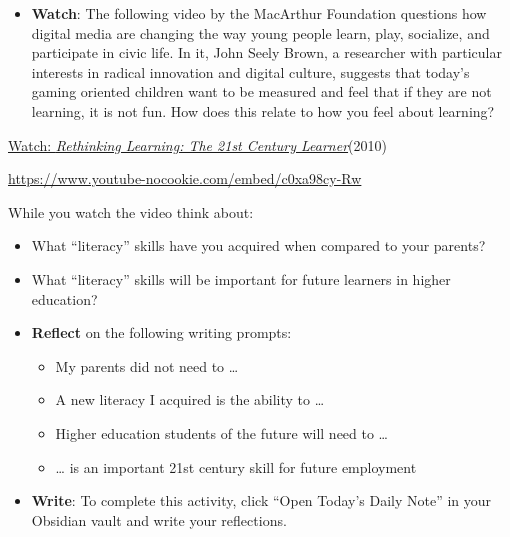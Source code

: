 \documentclass[
  letterpaper,
  DIV=11,
  numbers=noendperiod]{scrreprt}
\providecommand{\tightlist}{%
  \setlength{\itemsep}{0pt}\setlength{\parskip}{0pt}}\usepackage{longtable,booktabs,array}
\begin{document}
\begin{tcolorbox}[enhanced jigsaw, toprule=.15mm, colback=white, colframe=quarto-callout-note-color-frame, bottomtitle=1mm, leftrule=.75mm, coltitle=black, titlerule=0mm, rightrule=.15mm, colbacktitle=quarto-callout-note-color!10!white, left=2mm, title={Learning Activity}, opacitybacktitle=0.6, opacityback=0, breakable, toptitle=1mm, arc=.35mm, bottomrule=.15mm]

\begin{itemize}
\tightlist
\item
  \textbf{Watch}: The following video by the MacArthur Foundation
  questions how digital media are changing the way young people learn,
  play, socialize, and participate in civic life. In it, John Seely
  Brown, a researcher with particular interests in radical innovation
  and digital culture, suggests that today's gaming oriented children
  want to be measured and feel that if they are not learning, it is not
  fun. How does this relate to how you feel about learning?
\end{itemize}

\href{https://www.youtube.com/watch?v=c0xa98cy-Rw}{Watch:
\emph{Rethinking Learning: The 21st Century Learner}}(2010)

\url{https://www.youtube-nocookie.com/embed/c0xa98cy-Rw}

While you watch the video think about:

\begin{itemize}
\item
  What ``literacy'' skills have you acquired when compared to your
  parents?
\item
  What ``literacy'' skills will be important for future learners in
  higher education?
\item
  \textbf{Reflect} on the following writing prompts:

  \begin{itemize}
  \tightlist
  \item
    My parents did not need to \ldots{}
  \item
    A new literacy I acquired is the ability to \ldots{}
  \item
    Higher education students of the future will need to \ldots{}
  \item
    \ldots{} is an important 21st century skill for future employment
  \end{itemize}
\item
  \textbf{Write}: To complete this activity, click ``Open Today's Daily
  Note'' in your Obsidian vault and write your reflections.
\end{itemize}


\end{tcolorbox}
\end{document}
